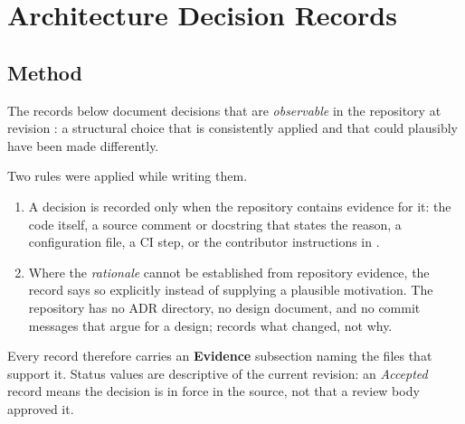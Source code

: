 
\chapter{Architecture Decision Records}
\label{ch:adr}

\section*{Method}

The records below document decisions that are \emph{observable} in the
repository at revision \texttt{\projectrevision}: a structural choice that is
consistently applied and that could plausibly have been made differently.

Two rules were applied while writing them.

\begin{enumerate}
  \item A decision is recorded only when the repository contains evidence for
    it: the code itself, a source comment or docstring that states the reason,
    a configuration file, a CI step, or the contributor instructions in
    .
  \item Where the \emph{rationale} cannot be established from repository
    evidence, the record says so explicitly instead of supplying a plausible
    motivation. The repository has no ADR directory, no design document, and no
    commit messages that argue for a design;  records
    what changed, not why.
\end{enumerate}

Every record therefore carries an \textbf{Evidence} subsection naming the files
that support it. Status values are descriptive of the current revision: an
\emph{Accepted} record means the decision is in force in the source, not that a
review body approved it.











